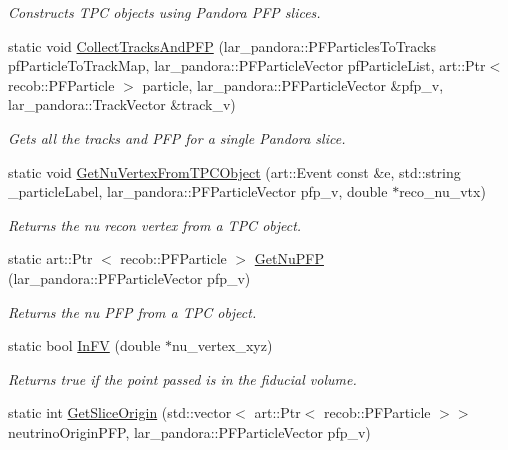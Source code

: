 \begin{DoxyCompactItemize}
\begin{DoxyCompactList}\small\item\em \-Constructs \-T\-P\-C objects using \-Pandora \-P\-F\-P slices. \end{DoxyCompactList}\item 
static void \hyperlink{classUBXSecHelper_ab441342f0c71741e353f323a26f27728}{\-Collect\-Tracks\-And\-P\-F\-P} (lar\-\_\-pandora\-::\-P\-F\-Particles\-To\-Tracks pf\-Particle\-To\-Track\-Map, lar\-\_\-pandora\-::\-P\-F\-Particle\-Vector pf\-Particle\-List, art\-::\-Ptr$<$ recob\-::\-P\-F\-Particle $>$ particle, lar\-\_\-pandora\-::\-P\-F\-Particle\-Vector \&pfp\-\_\-v, lar\-\_\-pandora\-::\-Track\-Vector \&track\-\_\-v)
\begin{DoxyCompactList}\small\item\em \-Gets all the tracks and \-P\-F\-P for a single \-Pandora slice. \end{DoxyCompactList}\item 
static void \hyperlink{classUBXSecHelper_a0ffc9245fc9813c18a1880d7e6f0aefe}{\-Get\-Nu\-Vertex\-From\-T\-P\-C\-Object} (art\-::\-Event const \&e, std\-::string \-\_\-particle\-Label, lar\-\_\-pandora\-::\-P\-F\-Particle\-Vector pfp\-\_\-v, double $\ast$reco\-\_\-nu\-\_\-vtx)
\begin{DoxyCompactList}\small\item\em \-Returns the nu recon vertex from a \-T\-P\-C object. \end{DoxyCompactList}\item 
static art\-::\-Ptr\*
$<$ recob\-::\-P\-F\-Particle $>$ \hyperlink{classUBXSecHelper_a1803584104e1b6f618fe86b28aec1927}{\-Get\-Nu\-P\-F\-P} (lar\-\_\-pandora\-::\-P\-F\-Particle\-Vector pfp\-\_\-v)
\begin{DoxyCompactList}\small\item\em \-Returns the nu \-P\-F\-P from a \-T\-P\-C object. \end{DoxyCompactList}\item 
static bool \hyperlink{classUBXSecHelper_a4ff7e0d6774d5628cc2a3d19bb2d3492}{\-In\-F\-V} (double $\ast$nu\-\_\-vertex\-\_\-xyz)
\begin{DoxyCompactList}\small\item\em \-Returns true if the point passed is in the fiducial volume. \end{DoxyCompactList}\item 
static int \hyperlink{classUBXSecHelper_ade125cef08f3f9ab1562556e7ae977d1}{\-Get\-Slice\-Origin} (std\-::vector$<$ art\-::\-Ptr$<$ recob\-::\-P\-F\-Particle $>$$>$ neutrino\-Origin\-P\-F\-P, lar\-\_\-pandora\-::\-P\-F\-Particle\-Vector pfp\-\_\-v)
$$
\end{DoxyCompactItemize}
